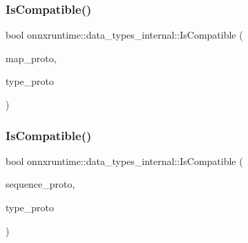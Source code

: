 \mbox{\label{namespaceonnxruntime_1_1data__types__internal_aece255300cd5b81ed09517ea20130c58}} 
\subsubsection{\texorpdfstring{Is\+Compatible()}{IsCompatible()}\hspace{0.1cm}{\footnotesize\ttfamily [2/4]}}
{\footnotesize\ttfamily bool onnxruntime\+::data\+\_\+types\+\_\+internal\+::\+Is\+Compatible (\begin{DoxyParamCaption}\item[{const O\+N\+N\+X\+\_\+\+N\+A\+M\+E\+S\+P\+A\+C\+E\+::\+Type\+Proto\+\_\+\+Map \&}]{map\+\_\+proto,  }\item[{const O\+N\+N\+X\+\_\+\+N\+A\+M\+E\+S\+P\+A\+C\+E\+::\+Type\+Proto\+\_\+\+Map \&}]{type\+\_\+proto }\end{DoxyParamCaption})}

\mbox{\label{namespaceonnxruntime_1_1data__types__internal_a44bb8561823e33ae70b877bcd51251c8}} 
\subsubsection{\texorpdfstring{Is\+Compatible()}{IsCompatible()}\hspace{0.1cm}{\footnotesize\ttfamily [3/4]}}
{\footnotesize\ttfamily bool onnxruntime\+::data\+\_\+types\+\_\+internal\+::\+Is\+Compatible (\begin{DoxyParamCaption}\item[{const O\+N\+N\+X\+\_\+\+N\+A\+M\+E\+S\+P\+A\+C\+E\+::\+Type\+Proto\+\_\+\+Sequence \&}]{sequence\+\_\+proto,  }\item[{const O\+N\+N\+X\+\_\+\+N\+A\+M\+E\+S\+P\+A\+C\+E\+::\+Type\+Proto\+\_\+\+Sequence \&}]{type\+\_\+proto }\end{DoxyParamCaption})}

